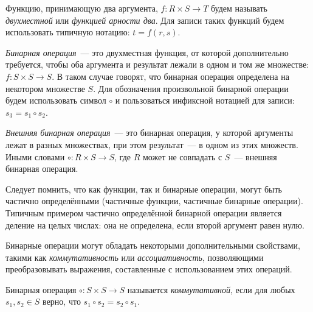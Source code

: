 \begin{definition}
    Функцию, принимающую два аргумента, $f: R \times S \to T$ будем называть \emph{двухместной} или \emph{функцией арности два}.
    Для записи таких функций будем использовать типичную нотацию: $t = f(r, s)$.
\end{definition}

\begin{definition}
    \emph{Бинарная операция}~--- это двухместная функция, от которой дополнительно требуется, чтобы оба аргумента и результат лежали в одном и том же множестве: $f: S \times S \to S$.
    В таком случае говорят, что бинарная операция определена на некотором множестве $S$. Для обозначения произвольной бинарной операции будем использовать символ $\circ$ и пользоваться инфиксной нотацией для записи: $s_3 = s_1 \circ s_2$.
\end{definition}

\begin{definition}
    \emph{Внешняя бинарная операция}~--- это бинарная операция, у которой аргументы лежат в разных множествах, при этом результат~--- в одном из этих множеств.
    Иными словами $\circ: R \times S \to S$, где $R$ может не совпадать с $S$~--- внешняя бинарная операция.
\end{definition}

Следует помнить, что как функции, так и бинарные операции, могут быть частично определёнными (частичные функции, частичные бинарные операции).
Типичным примером частично определённой бинарной операции является деление на целых числах: она не определена, если второй аргумент равен нулю.

Бинарные операции могут обладать некоторыми дополнительными свойствами, такими как \emph{коммутативность} или \emph{ассоциативность}, позволяющими преобразовывать выражения, составленные с использованием этих операций.

\begin{definition}
    Бинарная операция $\circ : S \times S \to S$ называется \emph{коммутативной}, если для любых $s_1, s_2 \in S$ верно, что $s_1 \circ s_2 = s_2 \circ s_1$.
\end{definition}

